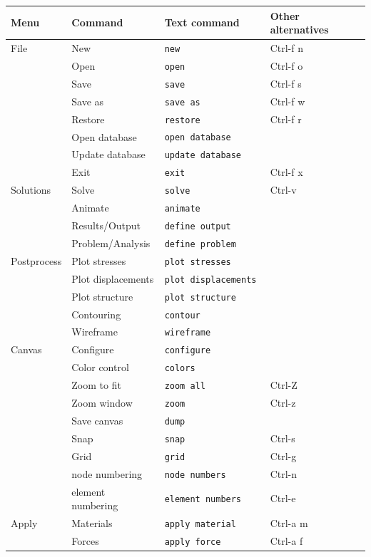 {\scriptsize
\begin{center}
 \begin{tabular}{p{1in}p{1.25in}p{1.75in}p{1.5in}} 
\hline
Menu	& Command	& Text command & Other alternatives\\
\hline
File		& New		& \tt new 		& Ctrl-f n \\
		& Open		& \tt open 		& Ctrl-f o \\
		& Save		& \tt save 		& Ctrl-f s \\
		& Save as	& \tt save as 		& Ctrl-f w \\
		& Restore	& \tt restore 		& Ctrl-f r \\
		& Open database & \tt open database 	& \\
		& Update database & \tt update database	& \\
		& Exit		& \tt exit		& Ctrl-f x \\
Solutions	& Solve		& \tt solve 		& Ctrl-v \\
                & Animate       & \tt animate           & \\
		& Results/Output & \tt define output 	& \\
                & Problem/Analysis & \tt define problem & \\ 
Postprocess	& Plot stresses & \tt plot stresses	& \\
		& Plot displacements & \tt plot displacements & \\
		& Plot structure & \tt plot structure 	& \\
		& Contouring 	& \tt contour		& \\
		& Wireframe	& \tt wireframe		& \\
Canvas		& Configure	& \tt configure 	& \\
		& Color control & \tt colors            & \\
		& Zoom to fit   & \tt zoom all 		& Ctrl-Z \\
		& Zoom window	& \tt zoom 		& Ctrl-z \\
		& Save canvas	& \tt dump		& \\
		& Snap		& \tt snap 		& Ctrl-s \\
		& Grid		& \tt grid 		& Ctrl-g \\
		& node numbering & \tt node numbers 	& Ctrl-n \\
		& element numbering & \tt element numbers & Ctrl-e \\
Apply		& Materials	& \tt apply material 	& Ctrl-a m \\
		& Forces	& \tt apply force	& Ctrl-a f \\

\end{tabular}
\end{center}}
